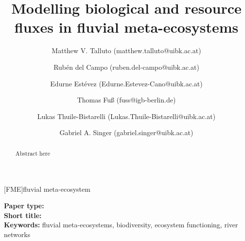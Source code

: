 



%
%

\title{Modelling biological and resource fluxes in fluvial meta-ecosystems}
\author[1,*]{Matthew V. Talluto (matthew.talluto@uibk.ac.at)}
\author[1]{Rubén del Campo (ruben.del-campo@uibk.ac.at)}
\author[1,2]{Edurne Estévez (Edurne.Estevez-Cano@uibk.ac.at)}
\author[3]{Thomas Fuß (fuss@igb-berlin.de)}
\author[1]{Lukas Thuile-Bistarelli (Lukas.Thuile-Bistarelli@uibk.ac.at)}
\author[1,3]{Gabriel A. Singer (gabriel.singer@uibk.ac.at)}


\newcommand{\fitem}[2]{\item {\bfseries #1} \\ #2}



\begin{acronym}
	[FME]{fluvial meta-ecosystem}
\end{acronym}


\begin{titlepage}
	\maketitle
	\begin{flushleft}
		\textbf{Paper type:} \\
		\textbf{Short title:} \\
		\textbf{Keywords:} fluvial meta-ecosystems, biodiversity, ecosystem functioning, river networks
	\end{flushleft}

	\begin{abstract}
		Abstract here
	\end{abstract}
\end{titlepage}

